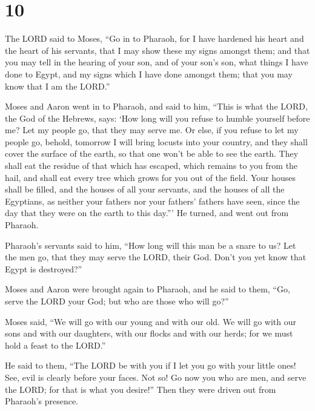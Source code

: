 \hypertarget{section-9}{%
\section{10}\label{section-9}}

 The LORD said to Moses, ``Go in to Pharaoh, for I have
hardened his heart and the heart of his servants, that I may show these
my signs amongst them;  and that you may tell in the
hearing of your son, and of your son's son, what things I have done to
Egypt, and my signs which I have done amongst them; that you may know
that I am the LORD.''

 Moses and Aaron went in to Pharaoh, and said to him,
``This is what the LORD, the God of the Hebrews, says: `How long will
you refuse to humble yourself before me? Let my people go, that they may
serve me.  Or else, if you refuse to let my people go,
behold, tomorrow I will bring locusts into your country, 
and they shall cover the surface of the earth, so that one won't be able
to see the earth. They shall eat the residue of that which has escaped,
which remains to you from the hail, and shall eat every tree which grows
for you out of the field.  Your houses shall be filled,
and the houses of all your servants, and the houses of all the
Egyptians, as neither your fathers nor your fathers' fathers have seen,
since the day that they were on the earth to this day.''' He turned, and
went out from Pharaoh.

 Pharaoh's servants said to him, ``How long will this man
be a snare to us? Let the men go, that they may serve the LORD, their
God. Don't you yet know that Egypt is destroyed?''

 Moses and Aaron were brought again to Pharaoh, and he
said to them, ``Go, serve the LORD your God; but who are those who will
go?''

 Moses said, ``We will go with our young and with our old.
We will go with our sons and with our daughters, with our flocks and
with our herds; for we must hold a feast to the LORD.''

 He said to them, ``The LORD be with you if I let you go
with your little ones! See, evil is clearly before your faces.
 Not so! Go now you who are men, and serve the LORD; for
that is what you desire!'' Then they were driven out from Pharaoh's
presence.

